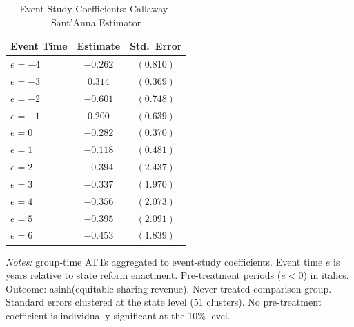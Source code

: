 \begin{table}[H]
\centering
\caption{Event-Study Coefficients: Callaway--Sant'Anna Estimator}
\label{tab:eventstudy}
\begin{threeparttable}
\begin{tabular}{lcc}
\toprule
Event Time & Estimate & Std.\ Error \\
\midrule
\textit{$e = -4$} & $-0.262$ & $(0.810)$ \\
\textit{$e = -3$} & $0.314$ & $(0.369)$ \\
\textit{$e = -2$} & $-0.601$ & $(0.748)$ \\
\textit{$e = -1$} & $0.200$ & $(0.639)$ \\
$e = 0$ & $-0.282$ & $(0.370)$ \\
$e = 1$ & $-0.118$ & $(0.481)$ \\
$e = 2$ & $-0.394$ & $(2.437)$ \\
$e = 3$ & $-0.337$ & $(1.970)$ \\
$e = 4$ & $-0.356$ & $(2.073)$ \\
$e = 5$ & $-0.395$ & $(2.091)$ \\
$e = 6$ & $-0.453$ & $(1.839)$ \\
\bottomrule
\end{tabular}
\begin{tablenotes}[flushleft]
\small
\item \textit{Notes:} \citet{callaway2021difference} group-time ATTs aggregated to event-study coefficients. Event time $e$ is years relative to state reform enactment. Pre-treatment periods ($e < 0$) in italics. Outcome: asinh(equitable sharing revenue). Never-treated comparison group. Standard errors clustered at the state level (51 clusters). No pre-treatment coefficient is individually significant at the 10\% level.
\end{tablenotes}
\end{threeparttable}
\end{table}
